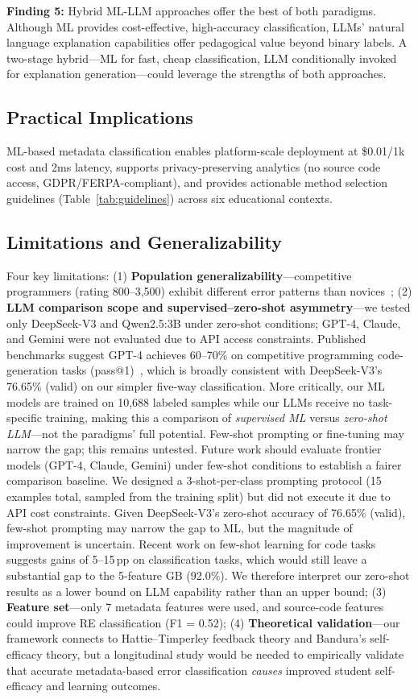 \documentclass[acmsmall]{acmart}
\begin{document}
\textbf{Finding 5:} Hybrid ML-LLM approaches offer the best of both paradigms.
Although ML provides cost-effective, high-accuracy classification, LLMs'
natural language explanation capabilities offer pedagogical value beyond
binary labels. A two-stage hybrid---ML for fast, cheap classification, LLM
conditionally invoked for explanation generation---could leverage the
strengths of both approaches.

\subsection*{Practical Implications}
ML-based metadata classification enables platform-scale deployment at
\$0.01/1k cost and 2ms latency, supports privacy-preserving analytics (no
source code access, GDPR/FERPA-compliant), and provides actionable method
selection guidelines (Table~\ref{tab:guidelines}) across six educational
contexts.

\subsection*{Limitations and Generalizability}
Four key limitations: (1) \textbf{Population generalizability}---competitive
programmers (rating 800--3,500) exhibit different error patterns than
novices~\cite{brown2014blackbox}; (2) \textbf{LLM comparison scope and supervised--zero-shot asymmetry}---we tested
only DeepSeek-V3 and Qwen2.5:3B under zero-shot conditions; GPT-4, Claude, and Gemini
were not evaluated due to API access constraints. Published benchmarks suggest
GPT-4 achieves 60--70\% on competitive programming code-generation tasks
(pass@1)~\cite{jin2024crosscodebench}, which is broadly consistent with DeepSeek-V3's
76.65\% (valid) on our simpler five-way classification. More critically, our ML models
are trained on 10,688 labeled samples while our LLMs receive no task-specific training,
making this a comparison of \emph{supervised ML} versus \emph{zero-shot LLM}---not the
paradigms' full potential. Few-shot prompting or fine-tuning may narrow the gap;
this remains untested. Future work should evaluate frontier models (GPT-4, Claude,
Gemini) under few-shot conditions to establish a fairer comparison baseline. We
designed a 3-shot-per-class prompting protocol (15 examples total, sampled from
the training split) but did not execute it due to API cost constraints. Given
DeepSeek-V3's zero-shot accuracy of 76.65\% (valid), few-shot prompting may narrow
the gap to ML, but the magnitude of improvement is uncertain. Recent work on
few-shot learning for code tasks suggests gains of 5--15\,pp on classification
tasks, which would still leave a substantial gap to the
5-feature GB (92.0\%). We therefore interpret our zero-shot results as a lower
bound on LLM capability rather than an upper bound; (3) \textbf{Feature
set}---only 7 metadata features were used, and source-code features could
improve RE classification (F1 = 0.52); (4) \textbf{Theoretical validation}---our
framework connects to Hattie--Timperley feedback theory and Bandura's
self-efficacy theory, but a longitudinal study would be needed to empirically
validate that accurate metadata-based error classification \emph{causes}
improved student self-efficacy and learning outcomes.
\end{document}
